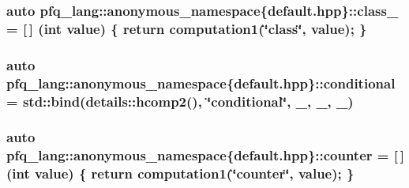 \hypertarget{namespacepfq__lang_1_1anonymous__namespace_02default_8hpp_03_a27a683ef93570a66844e1a0106e6336a}{
\subsubsection[{class\-\_\-}]{\setlength{\rightskip}{0pt plus 5cm}auto pfq\-\_\-lang\-::anonymous\-\_\-namespace\{default.\-hpp\}\-::class\-\_\- = \mbox{[}$\,$\mbox{]} (int value) \{ return {\bf computation1}(\char`\"{}class\char`\"{}, value); \}}}\label{namespacepfq__lang_1_1anonymous__namespace_02default_8hpp_03_a27a683ef93570a66844e1a0106e6336a}
\hypertarget{namespacepfq__lang_1_1anonymous__namespace_02default_8hpp_03_a022d0075edf2fff575b93377aec0c228}{
\subsubsection[{conditional}]{\setlength{\rightskip}{0pt plus 5cm}auto pfq\-\_\-lang\-::anonymous\-\_\-namespace\{default.\-hpp\}\-::conditional = std\-::bind(details\-::hcomp2(), \char`\"{}conditional\char`\"{}, \-\_, \-\_, \-\_)}}\label{namespacepfq__lang_1_1anonymous__namespace_02default_8hpp_03_a022d0075edf2fff575b93377aec0c228}
\hypertarget{namespacepfq__lang_1_1anonymous__namespace_02default_8hpp_03_a36fc8422d88371c2415438222a71ed11}{
\subsubsection[{counter}]{\setlength{\rightskip}{0pt plus 5cm}auto pfq\-\_\-lang\-::anonymous\-\_\-namespace\{default.\-hpp\}\-::counter = \mbox{[}$\,$\mbox{]} (int value) \{ return {\bf computation1}(\char`\"{}counter\char`\"{}, value); \}}}\label{namespacepfq__lang_1_1anonymous__namespace_02default_8hpp_03_a36fc8422d88371c2415438222a71ed11}
